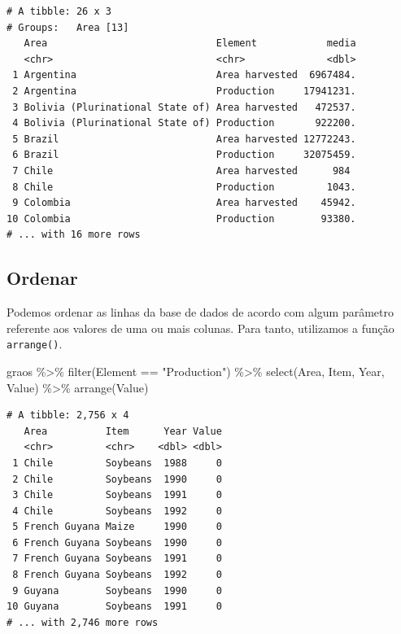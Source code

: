\documentclass[
  brazilian,
]{book}
\newenvironment{Shaded}{\begin{snugshade}}{\end{snugshade}}
\newcommand{\FunctionTok}[1]{\textcolor[rgb]{0.00,0.00,0.00}{#1}}
\newcommand{\NormalTok}[1]{#1}
\newcommand{\SpecialCharTok}[1]{\textcolor[rgb]{0.00,0.00,0.00}{#1}}
\newcommand{\StringTok}[1]{\textcolor[rgb]{0.31,0.60,0.02}{#1}}
\begin{document}
\begin{verbatim}
# A tibble: 26 x 3
# Groups:   Area [13]
   Area                             Element            media
   <chr>                            <chr>              <dbl>
 1 Argentina                        Area harvested  6967484.
 2 Argentina                        Production     17941231.
 3 Bolivia (Plurinational State of) Area harvested   472537.
 4 Bolivia (Plurinational State of) Production       922200.
 5 Brazil                           Area harvested 12772243.
 6 Brazil                           Production     32075459.
 7 Chile                            Area harvested      984 
 8 Chile                            Production         1043.
 9 Colombia                         Area harvested    45942.
10 Colombia                         Production        93380.
# ... with 16 more rows
\end{verbatim}

\hypertarget{ordenar}{%
\subsection{Ordenar}\label{ordenar}}

Podemos ordenar as linhas da base de dados de acordo com algum parâmetro referente aos valores de uma ou mais colunas. Para tanto, utilizamos a função \texttt{arrange()}.

\begin{Shaded}
\begin{Highlighting}[]
\NormalTok{graos }\SpecialCharTok{\%\textgreater{}\%} 
  \FunctionTok{filter}\NormalTok{(Element }\SpecialCharTok{==} \StringTok{"Production"}\NormalTok{) }\SpecialCharTok{\%\textgreater{}\%} 
  \FunctionTok{select}\NormalTok{(Area, Item, Year, Value) }\SpecialCharTok{\%\textgreater{}\%} 
  \FunctionTok{arrange}\NormalTok{(Value)}
\end{Highlighting}
\end{Shaded}

\begin{verbatim}
# A tibble: 2,756 x 4
   Area          Item      Year Value
   <chr>         <chr>    <dbl> <dbl>
 1 Chile         Soybeans  1988     0
 2 Chile         Soybeans  1990     0
 3 Chile         Soybeans  1991     0
 4 Chile         Soybeans  1992     0
 5 French Guyana Maize     1990     0
 6 French Guyana Soybeans  1990     0
 7 French Guyana Soybeans  1991     0
 8 French Guyana Soybeans  1992     0
 9 Guyana        Soybeans  1990     0
10 Guyana        Soybeans  1991     0
# ... with 2,746 more rows
\end{verbatim}
\end{document}
